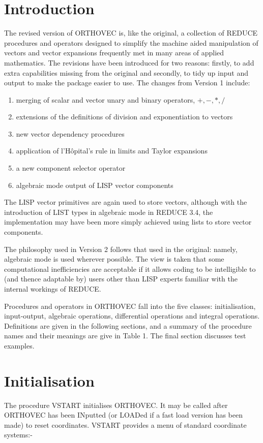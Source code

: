 \section{Introduction}
The revised version of ORTHOVEC\cite{Eastwood:91} is, like the
original\cite{Eastwood:87}, a collection of REDUCE procedures and
operators designed to simplify the machine aided manipulation of vectors
and vector expansions frequently met in many areas of applied mathematics.
The revisions have been introduced for two reasons: firstly, to add extra
capabilities missing from the original and secondly, to tidy up input and
output to make the package easier to use.
\newpage
The changes from Version 1 include:

\begin{enumerate}
\item merging of scalar and vector unary and binary operators, $+, - , *, /
$
\item extensions of the definitions of division and exponentiation
to vectors
\item new vector dependency procedures
\item application of l'H\^opital's rule in limits and Taylor expansions
\item a new component selector operator
\item algebraic mode output of LISP vector components
\end{enumerate}

The LISP vector primitives are again used to store vectors, although
with the introduction of LIST types in algebraic mode in REDUCE
3.4, the implementation may have been more simply achieved
using lists to store vector components.

The philosophy used in Version 2 follows that used in the original:
namely, algebraic mode is used wherever possible.  The view is taken
that some computational inefficiencies are acceptable if it allows
coding to be intelligible to (and thence adaptable by) users other
than LISP experts familiar with the internal workings of REDUCE.

Procedures and operators in ORTHOVEC fall into the five classes:
initialisation, input-output, algebraic operations, differential
operations and integral operations.  Definitions are given in
the following sections, and
a summary of the procedure names and their meanings are give in Table 1.
The final section discusses test examples.

\section{Initialisation}\label{vstart}
The procedure VSTART initialises ORTHOVEC.  It may be
called after ORTHOVEC has been INputted (or LOADed if a fast load
version has been made) to reset coordinates.  VSTART provides a
menu of standard coordinate systems:-


